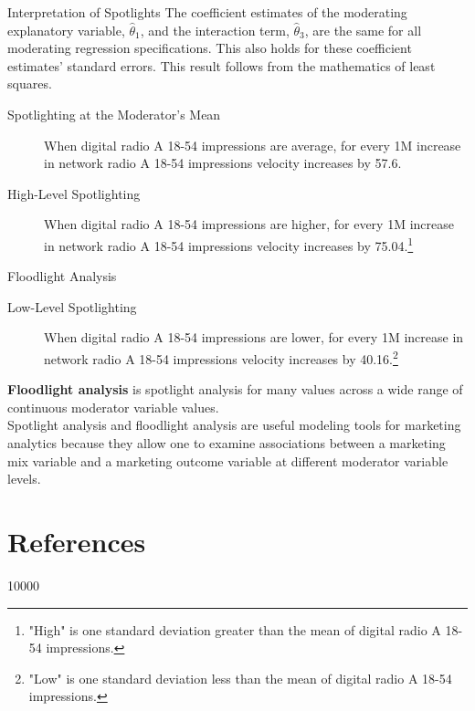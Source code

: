 \documentclass[pdf]{beamer}
\newcommand{\empr}[1]{{\color{franklinblue}\textbf{#1}}}
\theoremstyle{remark}
\theoremstyle{definition}
\begin{document}
\begin{frame}[t]{Interpretation of Spotlights}
The coefficient estimates of the moderating explanatory variable, $\hat{\theta}_1$, and the interaction term, $\hat{\theta}_3$, are the same for all moderating regression specifications.  This also holds for these coefficient estimates' standard errors.  This result follows from the mathematics of least squares.
\begin{description}
  \item [Spotlighting at the Moderator's Mean] When digital radio A 18-54 impressions are average, for every 1M increase in network radio A 18-54 impressions velocity increases by 57.6.
  \item [High-Level Spotlighting] When digital radio A 18-54 impressions are higher, for every 1M increase in network radio A 18-54 impressions velocity increases by 75.04.\footnote{"High" is  one standard deviation greater than the mean of digital radio A 18-54 impressions.} %
\end{description}
\end{frame}

\begin{frame}[t]{Floodlight Analysis}
\begin{description}
    \item [Low-Level Spotlighting] When digital radio A 18-54 impressions are lower, for every 1M increase in network radio A 18-54 impressions velocity increases by 40.16.\footnote{"Low" is one standard deviation less than the mean of digital radio A 18-54 impressions.} %
\end{description}
\vspace{1.5ex}
\empr{Floodlight analysis} is spotlight analysis for many values across a wide range of continuous moderator variable values. \\
\vspace{1.5ex}
Spotlight analysis and floodlight analysis are useful modeling tools for marketing analytics because they allow one to examine associations between a marketing mix variable and a marketing outcome variable at different moderator variable levels.  
\end{frame}

\section{References}

\begin{frame}[t,allowframebreaks]
 10000
\small


\end{frame}
\end{document}
